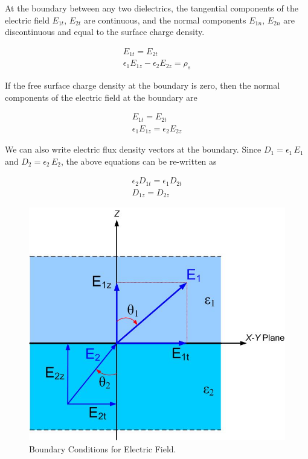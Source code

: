 \documentclass{ximera}
\begin{document}
At the boundary between any two dielectrics, the tangential components of the electric field $E_{1t}, \, E_{2t}$ are continuous, and the normal components $E_{1n}, \, E_{2n}$ are discontinuous and equal to the surface charge density.  


\begin{eqnarray}
E_{1t}=E_{2t} \\
\epsilon_1 E_{1z}-\epsilon_2 E_{2z}=\rho_s 
\end{eqnarray} 

If the free surface charge density at the boundary is zero, then the normal components of the electric field at the boundary are


\begin{eqnarray}
E_{1t}=E_{2t} \\
\epsilon_1 E_{1z}=\epsilon_2 E_{2z}
\end{eqnarray} 


We can also write electric flux density vectors at the boundary. Since     
 $D_1=\epsilon_1 \,E_1$ and   $D_{2}=\epsilon_2 \,E_{2}$, the above equations can be re-written as


\begin{eqnarray}
\epsilon_2 D_{1t}=\epsilon_1 D_{2t}  \\
D_{1z}=D_{2z}
\end{eqnarray} 

\begin{figure}[htbp]
\begin{center}
\includegraphics[scale=0.4]{../jpg/boundaryconditions.jpg}
\end{center}
\caption{Boundary Conditions for Electric Field.}
\label{fig:BoundaryCondition}
\end{figure}
\end{document}
